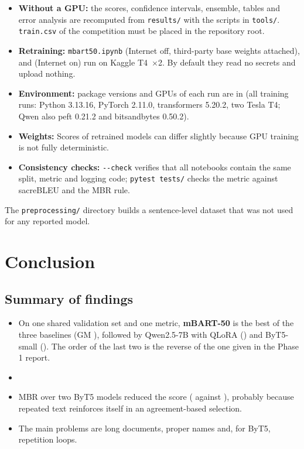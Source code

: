 \documentclass[a4paper,12pt]{article}
\begin{document}
\begin{itemize}
    \item \textbf{Without a GPU:} the scores, confidence intervals, ensemble, tables and error analysis are recomputed from \texttt{results/} with the scripts in \texttt{tools/}. \texttt{train.csv} of the competition must be placed in the repository root.
    \item \textbf{Retraining:} \texttt{mbart50.ipynb} (Internet off, third-party base weights attached),  and  (Internet on) run on Kaggle T4~$\times$2. By default they read no secrets and upload nothing.
    \item \textbf{Environment:} package versions and GPUs of each run are in  (all training runs: Python 3.13.16, PyTorch 2.11.0, transformers 5.20.2, two Tesla T4; Qwen also peft 0.21.2 and bitsandbytes 0.50.2).
    \item \textbf{Weights:} \WeightsSentence{} Scores of retrained models can differ slightly because GPU training is not fully deterministic.
    \item \textbf{Consistency checks:}  \texttt{-{}-check} verifies that all notebooks contain the same split, metric and logging code; \texttt{pytest tests/} checks the metric against sacreBLEU and the MBR rule.
\end{itemize}

The \texttt{preprocessing/} directory builds a sentence-level dataset that was not used for any reported model.

\section{Conclusion}

\subsection{Summary of findings}
\begin{itemize}
    \item On one shared validation set and one metric, \textbf{mBART-50} is the best of the three baselines (GM \MbGM), followed by Qwen2.5-7B with QLoRA (\QwGM) and ByT5-small (\BtGM). The order of the last two is the reverse of the one given in the Phase 1 report.
    \item \EnsembleSummary
    \item MBR over two ByT5 models reduced the score (\BxGM{} against \BtGM), probably because repeated text reinforces itself in an agreement-based selection.
    \item The main problems are long documents, proper names and, for ByT5, repetition loops.
\end{itemize}
\end{document}
